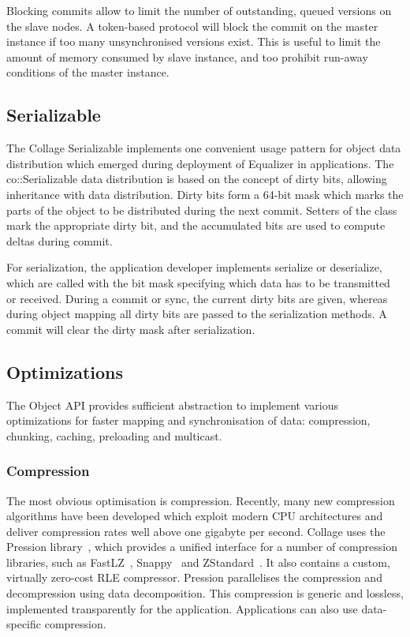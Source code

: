 Blocking commits allow to limit the number of outstanding, queued versions on
the slave nodes. A token-based protocol will block the commit on the master
instance if too many unsynchronised versions exist. This is useful to limit the
amount of memory consumed by slave instance, and too prohibit run-away
conditions of the master instance.

\subsection{Serializable}

\label{sec:Serializable}The \textsf{Collage} Serializable implements one
convenient usage pattern for object data distribution which emerged during
deployment of Equalizer in applications. The \textsf{co::Serializable} data
distribution is based on the concept of dirty bits, allowing inheritance with
data distribution. Dirty bits form a 64-bit mask which marks the parts of the
object to be distributed during the next commit. Setters of the class mark the
appropriate dirty bit, and the accumulated bits are used to compute deltas
during commit.

For serialization, the application developer implements \textsf{serialize} or
\textsf{deserialize}, which are called with the bit mask specifying which data
has to be transmitted or received. During a commit or sync, the current dirty
bits are given, whereas during object mapping all dirty bits are passed to the
serialization methods. A commit will clear the dirty mask after serialization.


\subsection{Optimizations}

The Object API provides sufficient abstraction to implement various
optimizations for faster mapping and synchronisation of data: compression,
chunking, caching, preloading and multicast.

\subsubsection{Compression}

The most obvious optimisation is compression. Recently, many new compression
algorithms have been developed which exploit modern CPU architectures and
deliver compression rates well above one gigabyte per second. \textsf{Collage}
uses the Pression library~\cite{pression}, which provides a unified interface
for a number of compression libraries, such as FastLZ~\cite{jesperfast},
Snappy~\cite{snappy} and ZStandard~\cite{zstd}. It also contains a custom,
virtually zero-cost RLE compressor. Pression parallelises the compression and
decompression using data decomposition. This compression is generic and
lossless, implemented transparently for the application. Applications can also
use data-specific compression.

